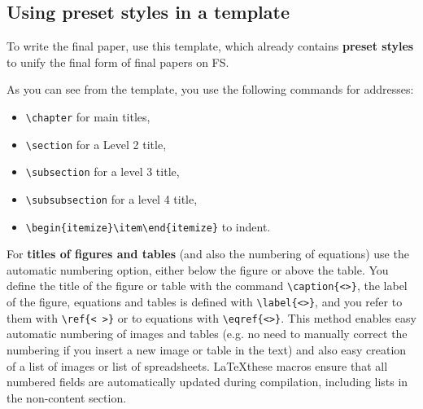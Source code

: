 \subsection{Using preset styles in a template}\label{sec:presets}
To write the final paper, use this template, which already contains \textbf{preset styles} to unify the final form of final papers on FS.

As you can see from the template, you use the following commands for addresses:
\begin{itemize}
\item \verb|\chapter| for main titles,
\item \verb|\section| for a Level 2 title,
\item \verb|\subsection| for a level 3 title,
\item \verb|\subsubsection| for a level 4 title,
\item \verb|\begin{itemize}\item\end{itemize}| to indent.
\end{itemize}

For \textbf{titles of figures and tables} (and also the numbering of equations) use the automatic numbering option, either below the figure or above the table. You define the title of the figure or table with the command \verb|\caption{<>}|, the label of the figure, equations and tables is defined with \verb|\label{<>}|, and you refer to them with \verb|\ref{< >}| or to equations with \verb|\eqref{<>}|. This method enables easy automatic numbering of images and tables (e.g. no need to manually correct the numbering if you insert a new image or table in the text) and also easy creation of a list of images or list of spreadsheets. \LaTeX these macros ensure that all numbered fields are automatically updated during compilation, including lists in the non-content section.

